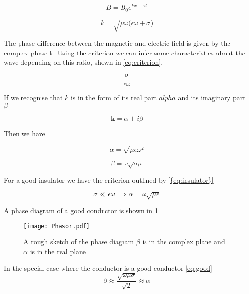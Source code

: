 \documentclass[12pt]{article}
\begin{document}
\begin{equation}
\label{eq:planewave}
B=B_{0}e^{kx-\omega{t}}
\end{equation}

\begin{equation}
\label{eq:relation}
k=\sqrt{\mu\omega(\epsilon\omega+\sigma})
\end{equation}

The phase difference between the magnetic and electric field is given by the complex phase  k. Using the criterion we can infer some characteristics about the wave depending on this ratio, shown in \cref{eq:criterion}. 

\begin{equation}
\label{eq:criterion}
\frac{\sigma}{\epsilon\omega}
\end{equation}

If we recognise that $k$ is in the form of its real part $alpha$ and its imaginary part $\beta$

\begin{equation}
\label{eq:complex}
\mathbf{k}=\alpha+i\beta
\end{equation}

Then we have 

\begin{equation}
\label{eq:alpha}
\alpha=\sqrt{\mu\epsilon\omega^{2}}
\end{equation}

\begin{equation}
\label{eq:beta}
\beta=\omega\sqrt{\sigma\mu}
\end{equation}

For a good insulator we have the criterion outlined by \cref{{eq:insulator}}

\begin{equation}
\label{eq:insulator}
\sigma \ll \epsilon\omega\implies \alpha=\omega \sqrt{\mu\epsilon}
\end{equation}


A phase diagram of a good conductor is shown in \cref{fig:phase}

\begin{figure}[H]
\centering
\texttt{[image: Phasor.pdf]}
\caption{A rough sketch of the phase diagram $\beta$ is in the complex plane and $\alpha$ is in the real plane}
\label{fig:phase}
\end{figure}


In the special case where the conductor is a good conductor \cref{eq:good}
\begin{equation}
\label{eq:good}
\beta\approx \frac{\sqrt{\omega\mu\sigma}}{\sqrt{2}}\approx \alpha
\end{equation}
\end{document}
